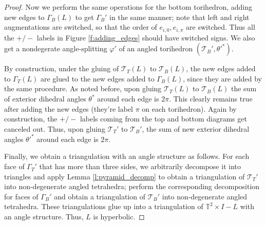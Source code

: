 \documentclass[11pt]{amsart}
\newcommand{\lemref}[1]{Lemma \ref{#1}}
\newcommand{\figref}[1]{Figure \ref{#1}}
\newcommand{\torus}{{\mathbb{T}^2}}
\newcommand{\sT}{{\mathcal{T}}}
\newcommand{\vphi}{\varphi}
\newcommand{\toruscomp}[1]{{\torus \times I - #1}}
\theoremstyle{plain}
\theoremstyle{definition}
\begin{document}
\begin{proof}
Now we perform the same operations for the bottom torihedron,
adding new edges to $\Gamma_B(L)$ to get $\Gamma_B'$
in the same manner;
note that left and right augmentations are switched,
so that the order of $e_{i,0},e_{i,\pi}$ are switched.
Thus all the $+/-$ labels in \figref{f:adding_edges}
should have switched signs.
We also get a nondegerate angle-splitting $\vphi'$
of an angled torihedron $(\sT_B',\theta'^*)$.


By construction, under the gluing of
$\sT_T(L)$ to $\sT_B(L)$,
the new edges added to $\Gamma_T(L)$
are glued to the new edges added to $\Gamma_B(L)$,
since they are added by the same procedure.
As noted before, upon gluing $\sT_T(L)$ to $\sT_B(L)$
the sum of exterior dihedral angles $\theta^*$ around each edge
is $2\pi$.
This clearly remains true after adding the new edges
(they're label $\pi$ on each torihedron).
Again by construction,
the $+/-$ labels coming from the top and bottom diagrams get canceled out.
Thus, upon gluing $\sT_T'$ to $\sT_B'$,
the sum of new exterior dihedral angles $\theta'^*$ around each edge
is $2\pi$.


Finally, we obtain a triangulation with an angle structure as follows.
For each face of $\Gamma_T'$ that has more than three sides,
we arbitrarily decompose it into triangles
and apply \lemref{l:pyramid_decomp}
to obtain a triangulation of $\sT_T'$ into non-degenerate angled tetrahedra;
perform the corresponding decomposition for faces of
$\Gamma_B'$ and obtain a triangulation of $\sT_B'$
into non-degenerate angled tetrahedra.
These triangulations glue up into a triangulation of $\toruscomp{L}$
with an angle structure.
Thus, $L$ is hyperbolic.
\end{proof}





\end{document}
